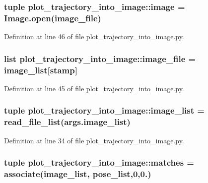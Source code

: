 \subsubsection[{image}]{\setlength{\rightskip}{0pt plus 5cm}tuple {\bf plot\-\_\-trajectory\-\_\-into\-\_\-image\-::image} = \-Image.\-open({\bf image\-\_\-file})}\label{namespaceplot__trajectory__into__image_a602c882140cf14c870220b296072757b}


\-Definition at line 46 of file plot\-\_\-trajectory\-\_\-into\-\_\-image.\-py.

\subsubsection[{image\-\_\-file}]{\setlength{\rightskip}{0pt plus 5cm}list {\bf plot\-\_\-trajectory\-\_\-into\-\_\-image\-::image\-\_\-file} = {\bf image\-\_\-list}[stamp]}\label{namespaceplot__trajectory__into__image_a3f904655ae4a1c278e81d21dea9b56d8}


\-Definition at line 45 of file plot\-\_\-trajectory\-\_\-into\-\_\-image.\-py.

\subsubsection[{image\-\_\-list}]{\setlength{\rightskip}{0pt plus 5cm}tuple {\bf plot\-\_\-trajectory\-\_\-into\-\_\-image\-::image\-\_\-list} = read\-\_\-file\-\_\-list(args.\-image\-\_\-list)}\label{namespaceplot__trajectory__into__image_ae4ef954c3dff91c017d9ac568a3443d1}


\-Definition at line 34 of file plot\-\_\-trajectory\-\_\-into\-\_\-image.\-py.

\subsubsection[{matches}]{\setlength{\rightskip}{0pt plus 5cm}tuple {\bf plot\-\_\-trajectory\-\_\-into\-\_\-image\-::matches} = associate({\bf image\-\_\-list}, {\bf pose\-\_\-list},0,0.)}\label{namespaceplot__trajectory__into__image_a9bd46f72b47e68ca8659b0f853486670}


